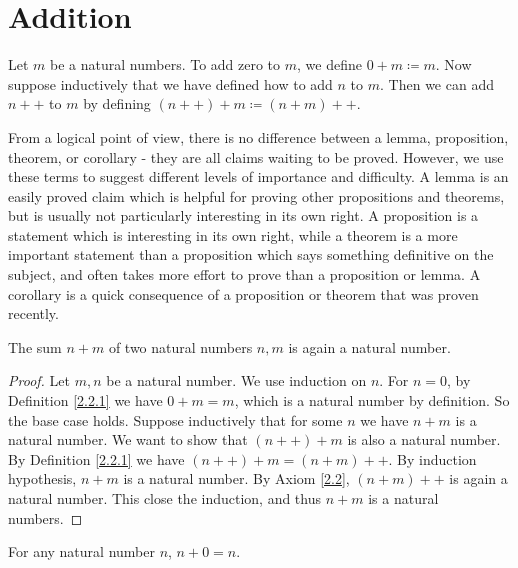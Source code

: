\section{Addition}\label{sec 2.2}

\begin{definition}\label{2.2.1}
Let \(m\) be a natural numbers.
To add zero to \(m\), we define \(0+m \coloneqq m\).
Now suppose inductively that we have defined how to add \(n\) to \(m\).
Then we can add \(n++\) to \(m\) by defining \((n++) + m \coloneqq (n + m)++\).
\end{definition}

\begin{note}
From a logical point of view, there is no difference between a lemma, proposition, theorem, or corollary
- they are all claims waiting to be proved.
However, we use these terms to suggest different levels of importance and difficulty.
A lemma is an easily proved claim which is helpful for proving other propositions and theorems, but is usually not particularly interesting in its own right.
A proposition is a statement which is interesting in its own right, while a theorem is a more important statement than a proposition which says something definitive on the subject, and often takes more effort to prove than a proposition or lemma.
A corollary is a quick consequence of a proposition or theorem that was proven recently.
\end{note}

\begin{additional corollary}\label{ac 2.2.1}
The sum \(n + m\) of two natural numbers \(n, m\) is again a natural number.
\end{additional corollary}

\begin{proof}
Let \(m, n\) be a natural number.
We use induction on \(n\).
For \(n = 0\), by Definition \ref{2.2.1} we have \(0 + m = m\), which is a natural number by definition.
So the base case holds.
Suppose inductively that for some \(n\) we have \(n + m\) is a natural number.
We want to show that \((n++) + m\) is also a natural number.
By Definition \ref{2.2.1} we have \((n++) + m = (n + m)++\).
By induction hypothesis, \(n + m\) is a natural number.
By Axiom \ref{2.2}, \((n + m)++\) is again a natural number.
This close the induction, and thus \(n + m\) is a natural numbers.
\end{proof}

\begin{lemma}\label{2.2.2}
For any natural number \(n\), \(n + 0 = n\).
\end{lemma}

